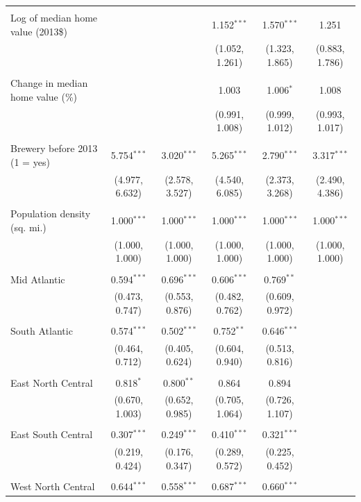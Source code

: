 \documentclass[]{article}
\begin{document}
\begin{landscape}
\begin{longtable}[c]{@{}lccccc@{}}
  & & & & & \\ 
 Log of median home value (2013\$) &  &  & 1.152$^{***}$ & 1.570$^{***}$ & 1.251 \\ 
  &  &  & (1.052, 1.261) & (1.323, 1.865) & (0.883, 1.786) \\ 
  & & & & & \\ 
 Change in median home value (\%) &  &  & 1.003 & 1.006$^{*}$ & 1.008 \\ 
  &  &  & (0.991, 1.008) & (0.999, 1.012) & (0.993, 1.017) \\ 
  & & & & & \\ 
 Brewery before 2013 (1 = yes) & 5.754$^{***}$ & 3.020$^{***}$ & 5.265$^{***}$ & 2.790$^{***}$ & 3.317$^{***}$ \\ 
  & (4.977, 6.632) & (2.578, 3.527) & (4.540, 6.085) & (2.373, 3.268) & (2.490, 4.386) \\ 
  & & & & & \\ 
 Population density (sq. mi.) & 1.000$^{***}$ & 1.000$^{***}$ & 1.000$^{***}$ & 1.000$^{***}$ & 1.000$^{***}$ \\ 
  & (1.000, 1.000) & (1.000, 1.000) & (1.000, 1.000) & (1.000, 1.000) & (1.000, 1.000) \\ 
  & & & & & \\ 
 Mid Atlantic & 0.594$^{***}$ & 0.696$^{***}$ & 0.606$^{***}$ & 0.769$^{**}$ &  \\ 
  & (0.473, 0.747) & (0.553, 0.876) & (0.482, 0.762) & (0.609, 0.972) &  \\ 
  & & & & & \\ 
 South Atlantic & 0.574$^{***}$ & 0.502$^{***}$ & 0.752$^{**}$ & 0.646$^{***}$ &  \\ 
  & (0.464, 0.712) & (0.405, 0.624) & (0.604, 0.940) & (0.513, 0.816) &  \\ 
  & & & & & \\ 
 East North Central & 0.818$^{*}$ & 0.800$^{**}$ & 0.864 & 0.894 &  \\ 
  & (0.670, 1.003) & (0.652, 0.985) & (0.705, 1.064) & (0.726, 1.107) &  \\ 
  & & & & & \\ 
 East South Central & 0.307$^{***}$ & 0.249$^{***}$ & 0.410$^{***}$ & 0.321$^{***}$ &  \\ 
  & (0.219, 0.424) & (0.176, 0.347) & (0.289, 0.572) & (0.225, 0.452) &  \\ 
  & & & & & \\ 
 West North Central & 0.644$^{***}$ & 0.558$^{***}$ & 0.687$^{***}$ & 0.660$^{***}$ &  \\ 

\end{longtable}
\end{landscape}
\end{document}
